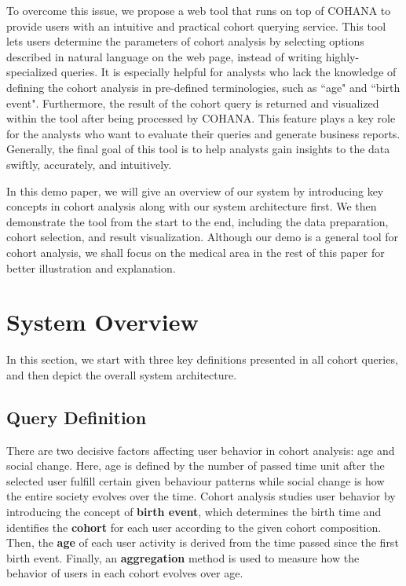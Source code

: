 \documentclass[10pt,conference,letterpaper]{IEEEtran}
\begin{document}
To overcome this issue, we propose a web tool that runs on top of COHANA to provide users with an intuitive and practical cohort querying service. 
This tool lets users determine the parameters of cohort analysis by selecting options described in natural language on the web page, instead of writing highly-specialized queries. 
It is especially helpful for analysts who lack the knowledge of defining the cohort analysis in pre-defined terminologies, such as ``age" and ``birth event". 
Furthermore, the result of the cohort query is returned and visualized within the tool
after being processed by COHANA.
This feature plays a key role for the analysts who want to evaluate their queries and generate business reports.
Generally, the final goal of this tool is to help analysts gain insights to the data swiftly, accurately, and intuitively.

In this demo paper, we will give an overview of our system by introducing key concepts in cohort analysis along with our system architecture first. We then demonstrate the tool from the start to the end, including the data preparation, cohort selection, and result visualization.
Although our demo is a general tool for cohort analysis, we shall focus on the medical area in the rest of this paper for better illustration and explanation.

\section{System Overview}
In this section, we start with three key definitions presented in all cohort queries, and then depict the overall system architecture.  

\subsection{Query Definition}

There are two decisive factors affecting user behavior in cohort analysis: age and social change. Here, age is defined by the number of passed time unit after the selected user fulfill certain given behaviour patterns while social change is how the entire society evolves over the time. 
Cohort analysis studies user behavior by introducing the concept of \textbf{birth event}, which determines the birth time and identifies the \textbf{cohort} for each user according to the given cohort composition. Then, the \textbf{age} of each user activity is derived from the time passed since the first birth event. Finally, an \textbf{aggregation} method is used to measure how the behavior of users in each cohort evolves over age.
\end{document}
